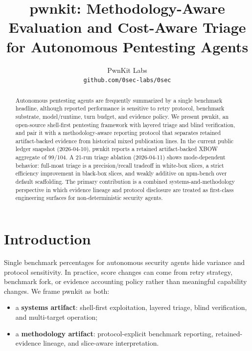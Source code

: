 \documentclass[11pt]{article}
\title{pwnkit: Methodology-Aware Evaluation and Cost-Aware Triage for Autonomous Pentesting Agents}
\author{
  PwnKit Labs \\
  \texttt{github.com/0sec-labs/0sec}
}
\date{}
\begin{document}
\maketitle

\begin{abstract}
Autonomous pentesting agents are frequently summarized by a single benchmark
headline, although reported performance is sensitive to retry protocol,
benchmark substrate, model/runtime, turn budget, and evidence policy. We
present pwnkit, an open-source shell-first pentesting framework with layered
triage and blind verification, and pair it with a methodology-aware reporting
protocol that separates retained artifact-backed evidence from historical mixed
publication lines. In the current public ledger snapshot (2026-04-10), pwnkit
reports a retained artifact-backed XBOW aggregate of 99/104. A 21-run triage
ablation (2026-04-11) shows mode-dependent behavior: full-moat triage is a
precision/recall tradeoff in white-box slices, a strict efficiency improvement
in black-box slices, and weakly additive on npm-bench over default scaffolding.
The primary contribution is a combined systems-and-methodology perspective in
which evidence lineage and protocol disclosure are treated as first-class
engineering surfaces for non-deterministic security agents.
\end{abstract}

\section{Introduction}

Single benchmark percentages for autonomous security agents hide variance and
protocol sensitivity. In practice, score changes can come from retry strategy,
benchmark fork, or evidence accounting policy rather than meaningful capability
changes. We frame pwnkit as both:

\begin{itemize}[leftmargin=*]
  \item a \textbf{systems artifact}: shell-first exploitation, layered triage,
  blind verification, and multi-target operation;
  \item a \textbf{methodology artifact}: protocol-explicit benchmark reporting,
  retained-evidence lineage, and slice-aware interpretation.
\end{itemize}
\end{document}
